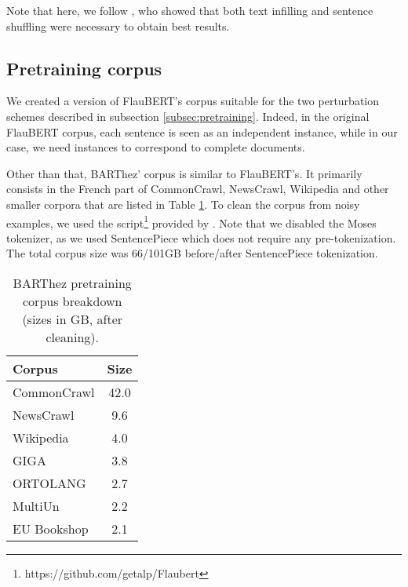 \documentclass[11pt,a4paper]{article}
\begin{document}
Note that here, we follow \citet{lewis2019bart}, who showed that both text infilling and sentence shuffling were necessary to obtain best results.

\subsection{Pretraining corpus} \label{subsec:pretraining_corpus}
We created a version of FlauBERT's corpus \cite{le2019flaubert} suitable for the two perturbation schemes described in subsection \ref{subsec:pretraining}.
Indeed, in the original FlauBERT corpus, each sentence is seen as an independent instance, while in our case, we need instances to correspond to complete documents.

Other than that, BARThez' corpus is similar to FlauBERT's. 
It primarily consists in the French part of CommonCrawl, NewsCrawl, Wikipedia and other smaller corpora that are listed in Table \ref{table:datasets}.
To clean the corpus from noisy examples, we used the script\footnote{https://github.com/getalp/Flaubert} provided by \citet{le2019flaubert}.
Note that we disabled the Moses tokenizer, as we used SentencePiece which does not require any pre-tokenization.
The total corpus size was 66/101GB before/after SentencePiece tokenization.

\begin{table}[ht]
  \begin{center}
  \small
    \begin{tabular}{|l|c|}
    \hline
      \textbf{Corpus} & \textbf{Size}\\
      \hline
      CommonCrawl & 42.0 \\
      NewsCrawl \cite{li2019findings} & 9.6 \\
      Wikipedia & 4.0 \\
      GIGA \cite{tiedemann2012parallel} & 3.8 \\
      ORTOLANG \cite{11403/est_republicain/v4} & 2.7\\
      MultiUn \cite{eisele2010multiun} & 2.2\\
      EU Bookshop \cite{skadicnvs2014billions}  & 2.1\\
      \hline
    \end{tabular}
  \end{center}
  \caption{BARThez pretraining corpus breakdown (sizes in GB, after cleaning). \label{table:datasets}}
\end{table}
\end{document}
